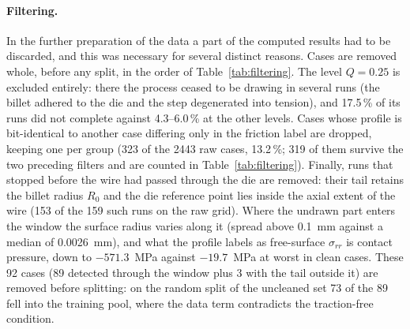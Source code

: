 \documentclass[subscriptcorrection,upint,varvw,barcolor=Goldenrod3,mathalfa=cal=euler,balance,hyphenate,french,pdf-a]{asmejour} %
\begin{document}
\paragraph{Filtering.}
In the further preparation of the data a part of the computed results had to be discarded, and this was necessary for several distinct reasons. Cases are removed whole, before any split, in the order of Table~\ref{tab:filtering}. The level $Q=0.25$ is excluded entirely: there the process ceased to be drawing in several runs (the billet adhered to the die and the step degenerated into tension), and 17.5\,\% of its runs did not complete against 4.3--6.0\,\% at the other levels. %
Cases whose profile is bit-identical to another case differing only in the friction label are dropped, keeping one per group (323 of the 2443 raw cases, 13.2\,\%; 319 of them survive the two preceding filters and are counted in Table~\ref{tab:filtering}). %
Finally, runs that stopped before the wire had passed through the die are removed: their tail retains the billet radius $R_0$ and the die reference point lies inside the axial extent of the wire (153 of the 159 such runs on the raw grid). %
Where the undrawn part enters the window the surface radius varies along it (spread above 0.1~mm against a median of 0.0026~mm), and what the profile labels as free-surface $\sigma_{rr}$ is contact pressure, down to $-571.3$~MPa against $-19.7$~MPa at worst in clean cases. %
These 92 cases (89 detected through the window plus 3 with the tail outside it) are removed before splitting: on the random split of the uncleaned set 73 of the 89 fell into the training pool, where the data term contradicts the traction-free condition. %
\end{document}
